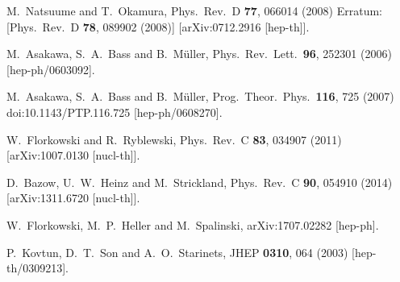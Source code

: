 \documentclass[article,twocolumn]{revtex4}
\begin{document}
\begin{thebibliography}{99}
  M.~Natsuume and T.~Okamura,
  Phys.\ Rev.\ D {\bf 77}, 066014 (2008)
  Erratum: [Phys.\ Rev.\ D {\bf 78}, 089902 (2008)]
  [arXiv:0712.2916 [hep-th]].

  M.~Asakawa, S.~A.~Bass and B.~M\"uller,
  Phys.\ Rev.\ Lett.\  {\bf 96}, 252301 (2006)
  [hep-ph/0603092].

  M.~Asakawa, S.~A.~Bass and B.~M\"uller,
  Prog.\ Theor.\ Phys.\  {\bf 116}, 725 (2007)
  doi:10.1143/PTP.116.725
  [hep-ph/0608270].
  
  W.~Florkowski and R.~Ryblewski,
  Phys.\ Rev.\ C {\bf 83}, 034907 (2011)
  [arXiv:1007.0130 [nucl-th]].
  
  D.~Bazow, U.~W.~Heinz and M.~Strickland,
  Phys.\ Rev.\ C {\bf 90}, 054910 (2014)
  [arXiv:1311.6720 [nucl-th]].

  W.~Florkowski, M.~P.~Heller and M.~Spalinski,
  arXiv:1707.02282 [hep-ph].
  
  P.~Kovtun, D.~T.~Son and A.~O.~Starinets,
  JHEP {\bf 0310}, 064 (2003)
  [hep-th/0309213].
 

\end{thebibliography}
\end{document}
